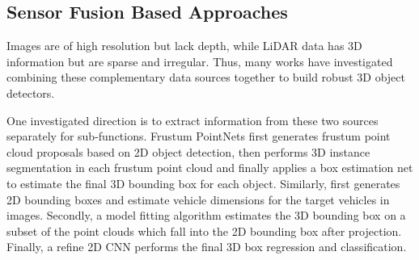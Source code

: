 \documentclass[a4paper,12pt]{article}
\begin{document}
\subsection{Sensor Fusion Based Approaches}

Images are of high resolution but lack depth, while LiDAR data has 3D information but are sparse and irregular. Thus, many works have investigated combining these complementary data sources together to build robust 3D object detectors. 

One investigated direction is to extract information from these two sources separately for sub-functions. Frustum PointNets \cite{DBLP:journals/corr/abs-1711-08488} first generates frustum point cloud proposals based on 2D object detection, then performs 3D instance segmentation in each frustum point cloud and finally applies a box estimation net to estimate the final 3D bounding box for each object. Similarly, \cite{DBLP:journals/corr/abs-1803-00387} first generates 2D bounding boxes and estimate vehicle dimensions for the target vehicles in images. Secondly, a model fitting algorithm estimates the 3D bounding box on a subset of the point clouds which fall into the 2D bounding box after projection. Finally, a refine 2D CNN performs the final 3D box regression and classification.
\end{document}
